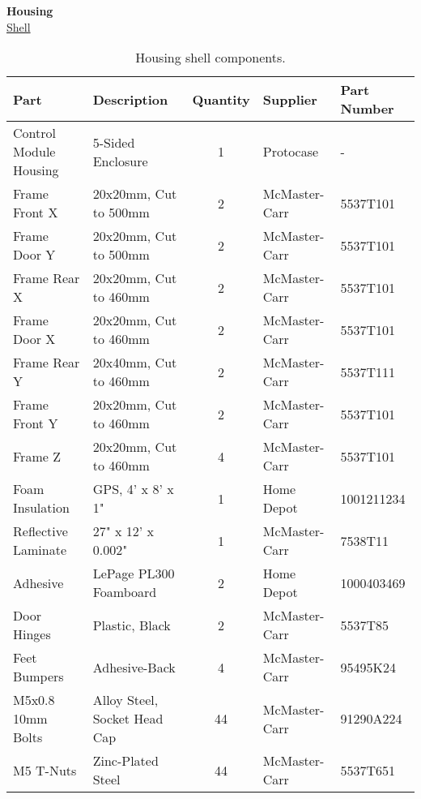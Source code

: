 \textbf{Housing}\\
\uline{Shell}
\begin{table}[!ht]
    \centering
    \begin{tabular}{|l|l|c|l|l|}
    \hline
        Part                    & Description                   & Quantity  & Supplier      & Part Number   \\ \hline
        Control Module Housing  & 5-Sided Enclosure             & 1         & Protocase     & -             \\ \hline
        Frame Front X           & 20x20mm, Cut to 500mm         & 2         & McMaster-Carr & 5537T101      \\ \hline
        Frame Door Y            & 20x20mm, Cut to 500mm         & 2         & McMaster-Carr & 5537T101      \\ \hline
        Frame Rear X            & 20x20mm, Cut to 460mm         & 2         & McMaster-Carr & 5537T101      \\ \hline
        Frame Door X            & 20x20mm, Cut to 460mm         & 2         & McMaster-Carr & 5537T101      \\ \hline
        Frame Rear Y            & 20x40mm, Cut to 460mm         & 2         & McMaster-Carr & 5537T111      \\ \hline
        Frame Front Y           & 20x20mm, Cut to 460mm         & 2         & McMaster-Carr & 5537T101      \\ \hline
        Frame Z                 & 20x20mm, Cut to 460mm         & 4         & McMaster-Carr & 5537T101      \\ \hline
        Foam Insulation         & GPS, 4' x 8' x 1"             & 1         & Home Depot    & 1001211234    \\ \hline
        Reflective Laminate     & 27" x 12' x 0.002"            & 1         & McMaster-Carr & 7538T11       \\ \hline
        Adhesive                & LePage PL300 Foamboard        & 2         & Home Depot    & 1000403469    \\ \hline
        Door Hinges             & Plastic, Black                & 2         & McMaster-Carr & 5537T85       \\ \hline
        Feet Bumpers            & Adhesive-Back                 & 4         & McMaster-Carr & 95495K24      \\ \hline
        M5x0.8 10mm Bolts       & Alloy Steel, Socket Head Cap  & 44        & McMaster-Carr & 91290A224     \\ \hline
        M5 T-Nuts               & Zinc-Plated Steel             & 44        & McMaster-Carr & 5537T651      \\ \hline
    \end{tabular}
    \caption{Housing shell components.}
    \label{tab:housing_shell_parts}
\end{table}

